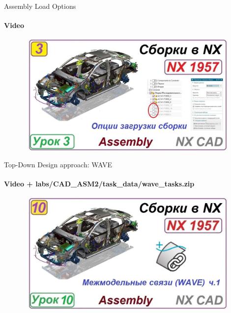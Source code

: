 \documentclass[aspectratio=169]{beamer}
\begin{document}
\begin{frame}[t]{Assembly Load Options}
    \framesubtitle{Video}
    \vspace{-0.6cm}
    \begin{figure}[H]
        \href{https://disk.yandex.ru/i/k4MD1IFF9-Z1lQ}{
            \centering\includegraphics[height=6cm,width=1\textwidth,keepaspectratio]{assembly_load_options_preview.jpg}}
        \label{fig:assembly_load_options_preview.jpg}
    \end{figure}
\end{frame}

\begin{frame}[t]{Top-Down Design approach: WAVE}
    \framesubtitle{Video + labs/CAD\_ASM2/task\_data/wave\_tasks.zip}
    \vspace{-0.6cm}
    \begin{figure}[H]
        \href{https://disk.yandex.ru/i/dAw7x_cJdu5VrA}{
            \centering\includegraphics[height=6cm,width=1\textwidth,keepaspectratio]{wave1_preview.jpg}}
        \label{fig:wave1_preview.jpg}
    \end{figure}
\end{frame}
\end{document}
